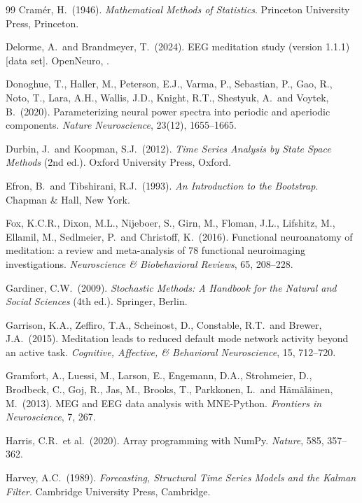 \begin{thebibliography}{99}
Cram\'er, H.\ (1946).
\textit{Mathematical Methods of Statistics}. Princeton University Press, Princeton.

Delorme, A.\ and Brandmeyer, T.\ (2024).
EEG meditation study (version 1.1.1) [data set].
OpenNeuro, .

Donoghue, T., Haller, M., Peterson, E.J., Varma, P., Sebastian, P., Gao, R., Noto, T., Lara, A.H., Wallis, J.D., Knight, R.T., Shestyuk, A.\ and Voytek, B.\ (2020).
Parameterizing neural power spectra into periodic and aperiodic components.
\textit{Nature Neuroscience}, 23(12), 1655--1665.

Durbin, J.\ and Koopman, S.J.\ (2012).
\textit{Time Series Analysis by State Space Methods} (2nd ed.). Oxford University Press, Oxford.

Efron, B.\ and Tibshirani, R.J.\ (1993).
\textit{An Introduction to the Bootstrap}. Chapman \& Hall, New York.

Fox, K.C.R., Dixon, M.L., Nijeboer, S., Girn, M., Floman, J.L., Lifshitz, M., Ellamil, M., Sedlmeier, P.\ and Christoff, K.\ (2016).
Functional neuroanatomy of meditation: a review and meta-analysis of 78 functional neuroimaging investigations.
\textit{Neuroscience \& Biobehavioral Reviews}, 65, 208--228.

Gardiner, C.W.\ (2009).
\textit{Stochastic Methods: A Handbook for the Natural and Social Sciences} (4th ed.). Springer, Berlin.

Garrison, K.A., Zeffiro, T.A., Scheinost, D., Constable, R.T.\ and Brewer, J.A.\ (2015).
Meditation leads to reduced default mode network activity beyond an active task.
\textit{Cognitive, Affective, \& Behavioral Neuroscience}, 15, 712--720.

Gramfort, A., Luessi, M., Larson, E., Engemann, D.A., Strohmeier, D., Brodbeck, C., Goj, R., Jas, M., Brooks, T., Parkkonen, L.\ and H\"am\"al\"ainen, M.\ (2013).
MEG and EEG data analysis with MNE-Python.
\textit{Frontiers in Neuroscience}, 7, 267.

Harris, C.R.\ et al.\ (2020).
Array programming with NumPy.
\textit{Nature}, 585, 357--362.

Harvey, A.C.\ (1989).
\textit{Forecasting, Structural Time Series Models and the Kalman Filter}. Cambridge University Press, Cambridge.


\end{thebibliography}
